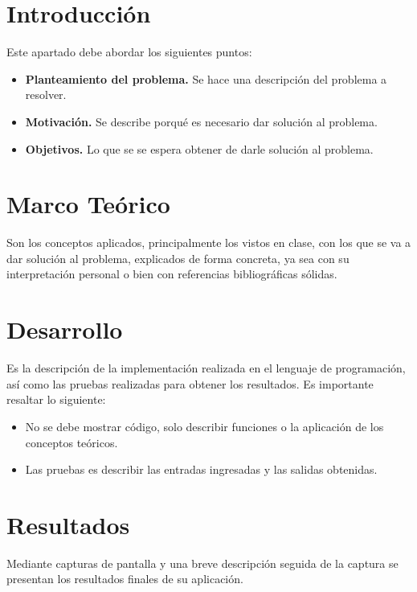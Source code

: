 \documentclass[letterpaper,12pt,oneside]{article}
\begin{document}
\tableofcontents
\clearpage
    

\section{Introducción} %

Este apartado debe abordar los siguientes puntos:

\begin{itemize}
    \item \textbf{Planteamiento del problema.} Se hace una descripción del problema a resolver.
    \item \textbf{Motivación.} Se describe porqué es necesario dar solución al problema.
    \item \textbf{Objetivos.} Lo que se se espera obtener de darle solución al problema.
\end{itemize}

\section{Marco Teórico}

Son los conceptos aplicados, principalmente los vistos en clase, con los que se va a dar solución al problema, explicados de forma concreta, ya sea con su interpretación personal o bien con referencias bibliográficas sólidas.~\cite{10.5555/576122}

\section{Desarrollo}

Es la descripción de la implementación realizada en el lenguaje de programación, así como las pruebas realizadas para obtener los resultados. Es importante resaltar lo siguiente:

\begin{itemize}
    \item No se debe mostrar código, solo describir funciones o la aplicación de los conceptos teóricos.
    \item Las pruebas es describir las entradas ingresadas y las salidas obtenidas.
\end{itemize}

\section{Resultados}

Mediante capturas de pantalla y una breve descripción seguida de la captura se presentan los resultados finales de su aplicación.
\end{document}
